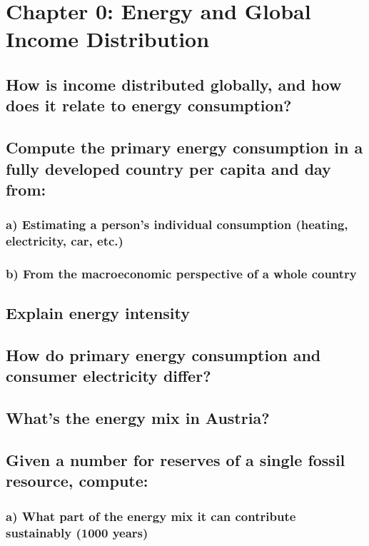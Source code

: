 \section{Chapter 0: Energy and Global Income Distribution}

\subsection{How is income distributed globally, and how does it relate to energy consumption?}
\solutionblock{}

\subsection{Compute the primary energy consumption in a fully developed country per capita and day from:}
\subsubsection{a) Estimating a person's individual consumption (heating, electricity, car, etc.)}
\solutionblock{}

\subsubsection{b) From the macroeconomic perspective of a whole country}
\solutionblock{}

\subsection{Explain energy intensity}
\solutionblock{}

\subsection{How do primary energy consumption and consumer electricity differ?}
\solutionblock{}

\subsection{What's the energy mix in Austria?}
\solutionblock{}

\subsection{Given a number for reserves of a single fossil resource, compute:}
\subsubsection{a) What part of the energy mix it can contribute sustainably (1000 years)}
\solutionblock{}

